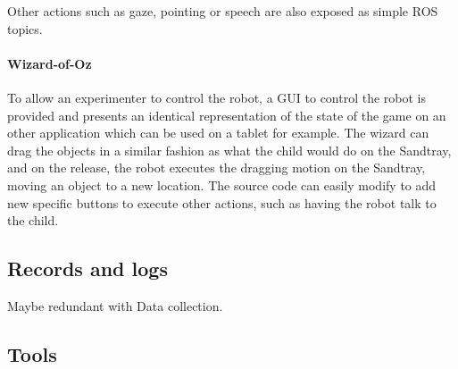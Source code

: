 \documentclass[sigconf]{acmart}
\begin{document}
Other actions such as gaze, pointing or speech are also exposed as simple ROS
topics.

\paragraph{Wizard-of-Oz} To allow an experimenter to control the robot, a GUI to control the robot is
provided and presents an identical representation of the state of the game on an
other application which can be used on a tablet for example. The wizard can drag
the objects in a similar fashion as what the child would do on the Sandtray, and
on the release, the robot executes the dragging motion on the Sandtray, moving
an object to a new location. The source code can easily modify to add new
specific buttons to execute other actions, such as having the robot talk to the
child.


\subsection{Records and logs}

Maybe redundant with Data  collection.

\subsection{Tools}
\end{document}
